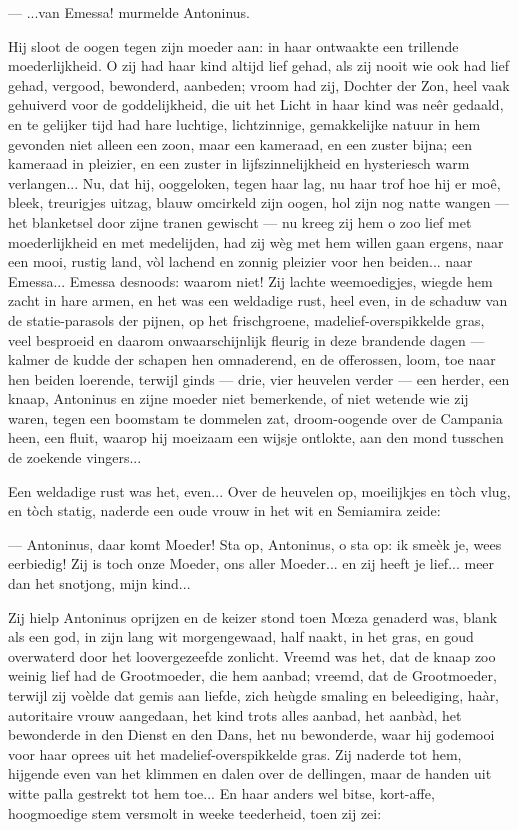 \documentclass[a4paper, 12pt, oneside, dutch]{article}
\begin{document}
--- ...van Emessa! murmelde Antoninus.

Hij sloot de oogen tegen zijn moeder aan: in haar ontwaakte een trillende moederlijkheid. O zij had haar kind altijd lief gehad, als zij nooit wie ook had lief gehad, vergood, bewonderd, aanbeden; vroom had zij, Dochter der Zon, heel vaak gehuiverd voor de goddelijkheid, die uit het Licht in haar kind was neêr gedaald, en te gelijker tijd had hare luchtige, lichtzinnige, gemakkelijke natuur in hem gevonden niet alleen een zoon, maar een kameraad, en een zuster bijna; een kameraad in pleizier, en een zuster in lijfszinnelijkheid en hysteriesch warm verlangen... Nu, dat hij, ooggeloken, tegen haar lag, nu haar trof hoe hij er moê, bleek, treurigjes uitzag, blauw omcirkeld zijn oogen, hol zijn nog natte wangen --- het blanketsel door zijne tranen gewischt --- nu kreeg zij hem o zoo lief met moederlijkheid en met medelijden, had zij wèg met hem willen gaan ergens, naar een mooi, rustig land, vòl lachend en zonnig pleizier voor hen beiden... naar Emessa... Emessa desnoods: waarom niet! Zij lachte weemoedigjes, wiegde hem zacht in hare armen, en het was een weldadige rust, heel even, in de schaduw van de statie-parasols der pijnen, op het frischgroene, madelief-overspikkelde gras, veel besproeid en daarom onwaarschijnlijk fleurig in deze brandende dagen --- kalmer de kudde der schapen hen omnaderend, en de offerossen, loom, toe naar hen beiden loerende, terwijl ginds --- drie, vier heuvelen verder --- een herder, een knaap, Antoninus en zijne moeder niet bemerkende, of niet wetende wie zij waren, tegen een boomstam te dommelen zat, droom-oogende over de Campania heen, een fluit, waarop hij moeizaam een wijsje ontlokte, aan den mond tusschen de zoekende vingers...

Een weldadige rust was het, even... Over de heuvelen op, moeilijkjes en tòch vlug, en tòch statig, naderde een oude vrouw in het wit en Semiamira zeide:

--- Antoninus, daar komt Moeder! Sta op, Antoninus, o sta op: ik smeèk je, wees eerbiedig! Zij is toch onze Moeder, ons aller Moeder... en zij heeft je lief... meer dan het snotjong, mijn kind...

Zij hielp Antoninus oprijzen en de keizer stond toen Mœza genaderd was, blank als een god, in zijn lang wit morgengewaad, half naakt, in het gras, en goud overwaterd door het loovergezeefde zonlicht. Vreemd was het, dat de knaap zoo weinig lief had de Grootmoeder, die hem aanbad; vreemd, dat de Grootmoeder, terwijl zij voèlde dat gemis aan liefde, zich heùgde smaling en beleediging, haàr, autoritaire vrouw aangedaan, het kind trots alles aanbad, het aanbàd, het bewonderde in den Dienst en den Dans, het nu bewonderde, waar hij godemooi voor haar oprees uit het madelief-overspikkelde gras. Zij naderde tot hem, hijgende even van het klimmen en dalen over de dellingen, maar de handen uit witte palla gestrekt tot hem toe... En haar anders wel bitse, kort-affe, hoogmoedige stem versmolt in weeke teederheid, toen zij zei:
\end{document}

